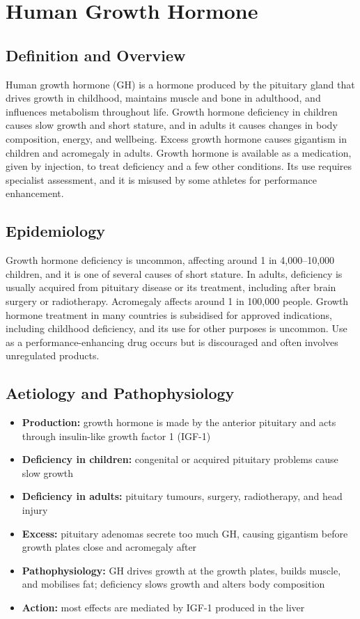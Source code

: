 \chapter{Human Growth Hormone}

\section*{Definition and Overview}
Human growth hormone (GH) is a hormone produced by the pituitary gland that drives growth in childhood, maintains muscle and bone in adulthood, and influences metabolism throughout life. Growth hormone deficiency in children causes slow growth and short stature, and in adults it causes changes in body composition, energy, and wellbeing. Excess growth hormone causes gigantism in children and acromegaly in adults. Growth hormone is available as a medication, given by injection, to treat deficiency and a few other conditions. Its use requires specialist assessment, and it is misused by some athletes for performance enhancement.

\section*{Epidemiology}
Growth hormone deficiency is uncommon, affecting around 1 in 4,000--10,000 children, and it is one of several causes of short stature. In adults, deficiency is usually acquired from pituitary disease or its treatment, including after brain surgery or radiotherapy. Acromegaly affects around 1 in 100,000 people. Growth hormone treatment in many countries is subsidised for approved indications, including childhood deficiency, and its use for other purposes is uncommon. Use as a performance-enhancing drug occurs but is discouraged and often involves unregulated products.

\section*{Aetiology and Pathophysiology}
\begin{itemize}
    \item \textbf{Production:} growth hormone is made by the anterior pituitary and acts through insulin-like growth factor 1 (IGF-1)
    \item \textbf{Deficiency in children:} congenital or acquired pituitary problems cause slow growth
    \item \textbf{Deficiency in adults:} pituitary tumours, surgery, radiotherapy, and head injury
    \item \textbf{Excess:} pituitary adenomas secrete too much GH, causing gigantism before growth plates close and acromegaly after
    \item \textbf{Pathophysiology:} GH drives growth at the growth plates, builds muscle, and mobilises fat; deficiency slows growth and alters body composition
    \item \textbf{Action:} most effects are mediated by IGF-1 produced in the liver
\end{itemize}

